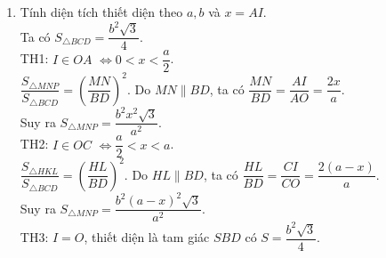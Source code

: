 \begin{vd}
{\begin{enumerate}
			Thiết diện là tam giác đều $MNP$ (vì đồng dạng với tam giác đều $SBD$).\\
			TH2: $I \in OC$. Ta có thiết diện là tam giác đều $HKL$ có các cạnh tương ứng song song với cạnh tam giác $SBD$.\\
			TH3: $I=O$, thiết diện là tam giác $SBD$.
			\item Tính diện tích thiết diện theo $a,b$ và $x=AI$.\\
			Ta có $S_{\triangle BCD}=\dfrac{b^2\sqrt{3}}{4}$.\\
			TH1: $I \in OA$ $\Leftrightarrow 0<x<\dfrac{a}{2}$.\\
			$\dfrac{S_{\triangle MNP}}{S_{\triangle BCD}}=\left(\dfrac{MN}{BD}\right)^2$. Do $MN \parallel BD$, ta có $\dfrac{MN}{BD}=\dfrac{AI}{AO}=\dfrac{2x}{a}$.\\
			Suy ra $S_{\triangle MNP}=\dfrac{b^2x^2\sqrt{3}}{a^2}$.\\
			TH2: $I \in OC$ $\Leftrightarrow \dfrac{a}{2}<x<a$.\\
			$\dfrac{S_{\triangle HKL}}{S_{\triangle BCD}}=\left(\dfrac{HL}{BD}\right)^2$. Do $HL \parallel BD$, ta có $\dfrac{HL}{BD}=\dfrac{CI}{CO}=\dfrac{2(a-x)}{a}$.\\
			Suy ra $S_{\triangle MNP}=\dfrac{b^2(a-x)^2\sqrt{3}}{a^2}$.\\
			TH3: $I=O$, thiết diện là tam giác $SBD$ có $S=\dfrac{b^2\sqrt{3}}{4}$.
		\end{enumerate}
		
	}
\end{vd}

